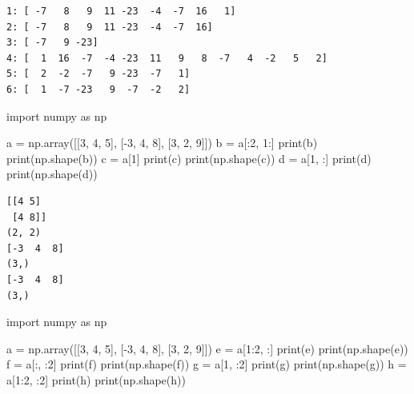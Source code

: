 \documentclass[
  english,
  letterpaper,
  DIV=11,
  numbers=noendperiod]{scrreprt}
\newenvironment{Shaded}{\begin{snugshade}}{\end{snugshade}}
\newcommand{\BuiltInTok}[1]{\textcolor[rgb]{0.00,0.23,0.31}{#1}}
\newcommand{\DecValTok}[1]{\textcolor[rgb]{0.68,0.00,0.00}{#1}}
\newcommand{\ImportTok}[1]{\textcolor[rgb]{0.00,0.46,0.62}{#1}}
\newcommand{\NormalTok}[1]{\textcolor[rgb]{0.00,0.23,0.31}{#1}}
\newcommand{\OperatorTok}[1]{\textcolor[rgb]{0.37,0.37,0.37}{#1}}
\begin{document}
\begin{verbatim}
1: [ -7   8   9  11 -23  -4  -7  16   1]
2: [ -7   8   9  11 -23  -4  -7  16]
3: [ -7   9 -23]
4: [  1  16  -7  -4 -23  11   9   8  -7   4  -2   5   2]
5: [  2  -2  -7   9 -23  -7   1]
6: [  1  -7 -23   9  -7  -2   2]
\end{verbatim}

\begin{Shaded}
\begin{Highlighting}[]
\ImportTok{import}\NormalTok{ numpy }\ImportTok{as}\NormalTok{ np}

\NormalTok{a }\OperatorTok{=}\NormalTok{ np.array([[}\DecValTok{3}\NormalTok{, }\DecValTok{4}\NormalTok{, }\DecValTok{5}\NormalTok{], [}\OperatorTok{{-}}\DecValTok{3}\NormalTok{, }\DecValTok{4}\NormalTok{, }\DecValTok{8}\NormalTok{], [}\DecValTok{3}\NormalTok{, }\DecValTok{2}\NormalTok{, }\DecValTok{9}\NormalTok{]])}
\NormalTok{b }\OperatorTok{=}\NormalTok{ a[:}\DecValTok{2}\NormalTok{, }\DecValTok{1}\NormalTok{:]}
\BuiltInTok{print}\NormalTok{(b)}
\BuiltInTok{print}\NormalTok{(np.shape(b))}
\NormalTok{c }\OperatorTok{=}\NormalTok{ a[}\DecValTok{1}\NormalTok{]}
\BuiltInTok{print}\NormalTok{(c)}
\BuiltInTok{print}\NormalTok{(np.shape(c))}
\NormalTok{d }\OperatorTok{=}\NormalTok{ a[}\DecValTok{1}\NormalTok{, :]}
\BuiltInTok{print}\NormalTok{(d)}
\BuiltInTok{print}\NormalTok{(np.shape(d))}
\end{Highlighting}
\end{Shaded}

\begin{verbatim}
[[4 5]
 [4 8]]
(2, 2)
[-3  4  8]
(3,)
[-3  4  8]
(3,)
\end{verbatim}

\begin{Shaded}
\begin{Highlighting}[]
\ImportTok{import}\NormalTok{ numpy }\ImportTok{as}\NormalTok{ np}

\NormalTok{a }\OperatorTok{=}\NormalTok{ np.array([[}\DecValTok{3}\NormalTok{, }\DecValTok{4}\NormalTok{, }\DecValTok{5}\NormalTok{], [}\OperatorTok{{-}}\DecValTok{3}\NormalTok{, }\DecValTok{4}\NormalTok{, }\DecValTok{8}\NormalTok{], [}\DecValTok{3}\NormalTok{, }\DecValTok{2}\NormalTok{, }\DecValTok{9}\NormalTok{]])}
\NormalTok{e }\OperatorTok{=}\NormalTok{ a[}\DecValTok{1}\NormalTok{:}\DecValTok{2}\NormalTok{, :]}
\BuiltInTok{print}\NormalTok{(e)}
\BuiltInTok{print}\NormalTok{(np.shape(e))}
\NormalTok{f }\OperatorTok{=}\NormalTok{ a[:, :}\DecValTok{2}\NormalTok{]}
\BuiltInTok{print}\NormalTok{(f)}
\BuiltInTok{print}\NormalTok{(np.shape(f))}
\NormalTok{g }\OperatorTok{=}\NormalTok{ a[}\DecValTok{1}\NormalTok{, :}\DecValTok{2}\NormalTok{]}
\BuiltInTok{print}\NormalTok{(g)}
\BuiltInTok{print}\NormalTok{(np.shape(g))}
\NormalTok{h }\OperatorTok{=}\NormalTok{ a[}\DecValTok{1}\NormalTok{:}\DecValTok{2}\NormalTok{, :}\DecValTok{2}\NormalTok{]}
\BuiltInTok{print}\NormalTok{(h)}
\BuiltInTok{print}\NormalTok{(np.shape(h))}
\end{Highlighting}
\end{Shaded}
\end{document}
